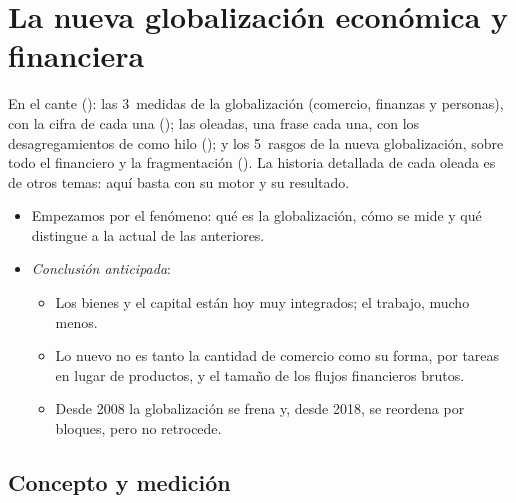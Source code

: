 \documentclass[11pt]{article}
\begin{document}
\section{La nueva globalización económica y financiera}\label{sec:globalizacion}

\begin{notaopositor}
En el cante (): las 3~medidas de la globalización (comercio, finanzas y personas), con la cifra de cada una (); las oleadas, una frase cada una, con los desagregamientos de  como hilo (); y los 5~rasgos de la nueva globalización, sobre todo el financiero y la fragmentación (). La historia detallada de cada oleada es de otros temas: aquí basta con su motor y su resultado.
\end{notaopositor}

\begin{itemize}
\item Empezamos por el fenómeno: qué es la globalización, cómo se mide y qué distingue a la actual de las anteriores.
\item \emph{Conclusión anticipada}:
  \begin{itemize}
  \item Los bienes y el capital están hoy muy integrados; el trabajo, mucho menos.
  \item Lo nuevo no es tanto la cantidad de comercio como su forma, por tareas en lugar de productos, y el tamaño de los flujos financieros brutos.
  \item Desde 2008 la globalización se frena y, desde 2018, se reordena por bloques, pero no retrocede.
  \end{itemize}
\end{itemize}

\subsection{Concepto y medición}\label{sec:medicion-globalizacion}
\end{document}
